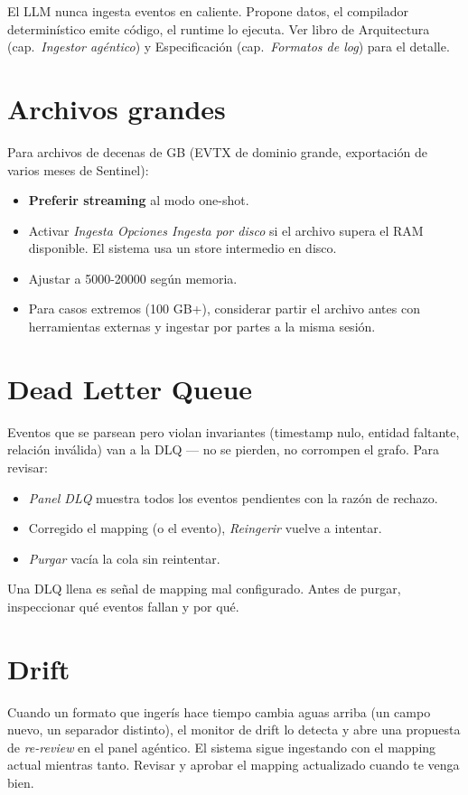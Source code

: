 El LLM nunca ingesta eventos en caliente. Propone datos, el
compilador determinístico emite código, el runtime lo ejecuta. Ver
libro de Arquitectura (cap.\ \emph{Ingestor agéntico}) y
Especificación (cap.\ \emph{Formatos de log}) para el detalle.

\section{Archivos grandes}

Para archivos de decenas de GB (EVTX de dominio grande,
exportación de varios meses de Sentinel):

\begin{itemize}
    \item \textbf{Preferir streaming} al modo one-shot.
    \item Activar \emph{Ingesta \textrightarrow{} Opciones
    \textrightarrow{} Ingesta por disco} si el archivo supera el RAM
    disponible. El sistema usa un store intermedio en disco.
    \item Ajustar  a 5000-20000
    según memoria.
    \item Para casos extremos (100 GB+), considerar partir el
    archivo antes con herramientas externas y ingestar por partes a
    la misma sesión.
\end{itemize}

\section{Dead Letter Queue}

Eventos que se parsean pero violan invariantes (timestamp nulo,
entidad faltante, relación inválida) van a la DLQ — no se pierden,
no corrompen el grafo. Para revisar:

\begin{itemize}
    \item \emph{Panel \textrightarrow{} DLQ} muestra todos los
    eventos pendientes con la razón de rechazo.
    \item Corregido el mapping (o el evento), \emph{Reingerir}
    vuelve a intentar.
    \item \emph{Purgar} vacía la cola sin reintentar.
\end{itemize}

Una DLQ llena es señal de mapping mal configurado. Antes de
purgar, inspeccionar qué eventos fallan y por qué.

\section{Drift}

Cuando un formato que ingerís hace tiempo cambia aguas arriba (un
campo nuevo, un separador distinto), el monitor de drift lo
detecta y abre una propuesta de \emph{re-review} en el panel
agéntico. El sistema sigue ingestando con el mapping actual
mientras tanto. Revisar y aprobar el mapping actualizado cuando te
venga bien.
